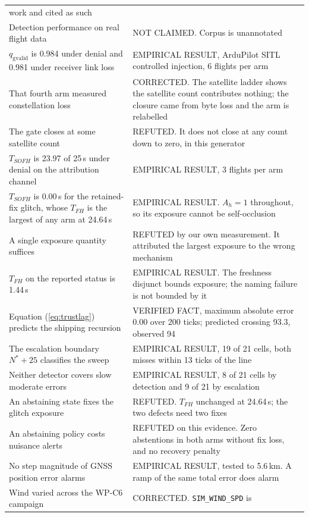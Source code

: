 \documentclass[11pt,a4paper]{article}
\newcommand{\code}[1]{\texttt{\small #1}}
\begin{document}
\begin{longtable}{p{}p{}}
work and cited as such \\
Detection performance on real flight data & NOT CLAIMED. Corpus is unannotated \\
$q_{\mathrm{gvalid}}$ is 0.984 under denial and 0.981 under receiver link loss
& EMPIRICAL RESULT, ArduPilot SITL controlled injection, 6 flights per arm \\
That fourth arm measured constellation loss & CORRECTED. The satellite ladder
shows the satellite count contributes nothing; the closure came from byte loss
and the arm is relabelled \\
The gate closes at some satellite count & REFUTED. It does not close at any
count down to zero, in this generator \\
$T_{SOFH}$ is 23.97 of 25\,s under denial on the attribution channel &
EMPIRICAL RESULT, 3 flights per arm \\
$T_{SOFH}$ is 0.00\,s for the retained-fix glitch, whose $T_{FH}$ is the
largest of any arm at 24.64\,s & EMPIRICAL RESULT. $A_h = 1$ throughout, so its
exposure cannot be self-occlusion \\
A single exposure quantity suffices & REFUTED by our own measurement. It
attributed the largest exposure to the wrong mechanism \\
$T_{FH}$ on the reported status is 1.44\,s & EMPIRICAL RESULT. The freshness
disjunct bounds exposure; the naming failure is not bounded by it \\
Equation (\ref{eq:trustlag}) predicts the shipping recursion & VERIFIED FACT,
maximum absolute error 0.00 over 200 ticks; predicted crossing 93.3, observed 94 \\
The escalation boundary $N^*+25$ classifies the sweep & EMPIRICAL RESULT, 19 of
21 cells, both misses within 13 ticks of the line \\
Neither detector covers slow moderate errors & EMPIRICAL RESULT, 8 of 21 cells
by detection and 9 of 21 by escalation \\
An abstaining state fixes the glitch exposure & REFUTED. $T_{FH}$ unchanged at
24.64\,s; the two defects need two fixes \\
An abstaining policy costs nuisance alerts & REFUTED on this evidence. Zero
abstentions in both arms without fix loss, and no recovery penalty \\
No step magnitude of GNSS position error alarms & EMPIRICAL RESULT, tested to
5.6\,km. A ramp of the same total error does alarm \\
Wind varied across the WP-C6 campaign & CORRECTED. \code{SIM\_WIND\_SPD} is

\end{longtable}
\end{document}
